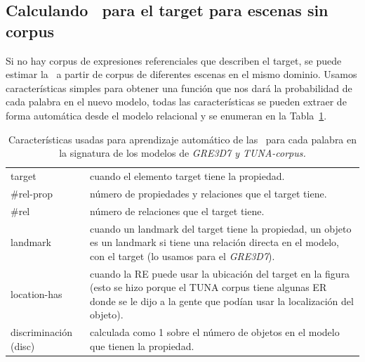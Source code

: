 \subsection{Calculando \puse\ para el target para escenas sin corpus } 
\label{subsec:learning}

%


Si no hay corpus de expresiones referenciales que describen el target, se puede estimar la \puse~a partir de corpus de
diferentes escenas en el mismo dominio.
Usamos caracter\'isticas simples para obtener una funci\'on que nos dar\'a la probabilidad de cada palabra en el nuevo modelo, todas las caracter\'isticas se pueden extraer de forma autom\'atica desde el modelo relacional y se enumeran en la Tabla~\ref{features}.

\begin{small}
\begin{table}[h]
\begin{center}
\begin{tabular}{|l|p{10cm}|}
\hline
target & cuando el elemento target tiene la propiedad. \\
\#rel-prop & n\'umero de propiedades y relaciones que el target tiene.\\
\#rel & n\'umero de relaciones que el target tiene. \\
landmark & cuando un landmark del target tiene la propiedad, un objeto es un landmark si tiene una relaci\'on directa en el modelo, con el target (lo usamos para el \textit{GRE3D7}).\\
location-has & cuando la RE puede usar la ubicaci\'on del target en la figura (esto se hizo porque el TUNA corpus tiene algunas ER donde se le dijo a la gente que pod\'ian usar la localizaci\'on del objeto).\\
discriminaci\'on (disc) & calculada como 1 sobre el n\'umero de objetos en el modelo que tienen la propiedad.  \\
\hline
\end{tabular}
\caption{Caracter\'isticas usadas para aprendizaje autom\'atico de las \puse~para cada palabra en la signatura de los modelos de \textit{GRE3D7 y TUNA-corpus.} \label{features}}
\end{center}
\end{table}
\end{small}


